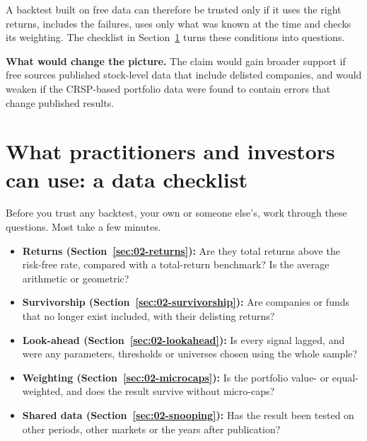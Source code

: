 A backtest built on free data can therefore be trusted only if it uses the right returns, includes the failures, uses only what was known at the time and checks its weighting. The checklist in Section~\ref{sec:02-checklist} turns these conditions into questions.

\textbf{What would change the picture.} The claim would gain broader support if free sources published stock-level data that include delisted companies, and would weaken if the CRSP-based portfolio data were found to contain errors that change published results.

\section{What practitioners and investors can use: a data checklist}
\label{sec:02-checklist}

Before you trust any backtest, your own or someone else's, work through these questions. Most take a few minutes.

\begin{itemize}
  \item[$\square$] \textbf{Returns (Section~\ref{sec:02-returns}):} Are they total returns above the risk-free rate, compared with a total-return benchmark? Is the average arithmetic or geometric?
  \item[$\square$] \textbf{Survivorship (Section~\ref{sec:02-survivorship}):} Are companies or funds that no longer exist included, with their delisting returns?
  \item[$\square$] \textbf{Look-ahead (Section~\ref{sec:02-lookahead}):} Is every signal lagged, and were any parameters, thresholds or universes chosen using the whole sample?
  \item[$\square$] \textbf{Weighting (Section~\ref{sec:02-microcaps}):} Is the portfolio value- or equal-weighted, and does the result survive without micro-caps?
  \item[$\square$] \textbf{Shared data (Section~\ref{sec:02-snooping}):} Has the result been tested on other periods, other markets or the years after publication?
\end{itemize}

\makeatletter
{}
\makeatother

